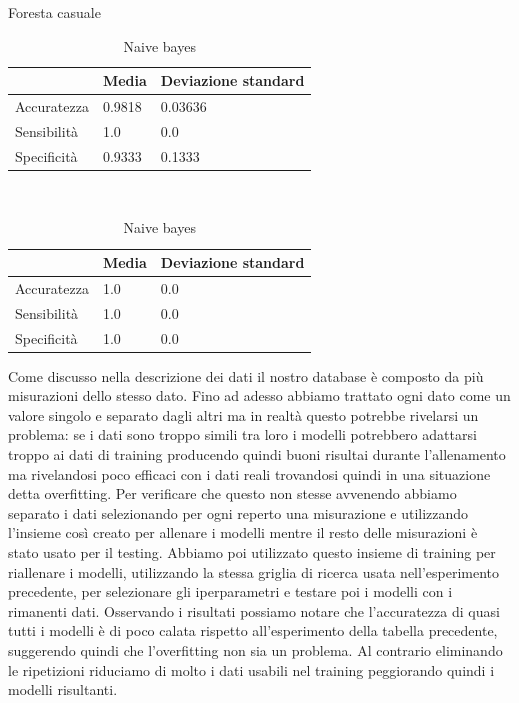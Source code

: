 \documentclass[a4paper,12pt]{report}
\begin{document}
\begin{table}
	\caption{Foresta casuale}
	\begin{tabular}{|l|l|l|}
	\hline
                & Media     & Deviazione standard	\\ \hline
	Accuratezza & 0.9818	& 0.03636				\\ \hline
    Sensibilità & 1.0		& 0.0					\\ \hline
    Specificità & 0.9333	& 0.1333				\\ \hline
	\end{tabular}
	\\


	\caption{Naive bayes}
	\begin{tabular}{|l|l|l|}
	\hline
                & Media     & Deviazione standard	\\ \hline
	Accuratezza & 1.0		& 0.0					\\ \hline
    Sensibilità & 1.0		& 0.0					\\ \hline
    Specificità & 1.0		& 0.0					\\ \hline
\end{tabular}
\end{table}


Come discusso nella descrizione dei dati il nostro database è composto da più
misurazioni dello stesso dato. Fino ad adesso abbiamo trattato ogni dato come un
valore singolo e separato dagli altri ma in realtà questo potrebbe rivelarsi un
problema: se i dati sono troppo simili tra loro i modelli potrebbero adattarsi
troppo ai dati di training producendo quindi buoni risultai durante
l'allenamento ma rivelandosi poco efficaci con i dati reali trovandosi quindi in
una situazione detta overfitting. Per verificare che questo non stesse avvenendo
abbiamo separato i dati selezionando per ogni reperto una misurazione e
utilizzando l'insieme così creato per allenare i modelli mentre il resto delle
misurazioni è stato usato per il testing. Abbiamo poi utilizzato questo insieme
di training per riallenare i modelli, utilizzando la stessa griglia di ricerca
usata nell'esperimento precedente, per selezionare gli iperparametri e testare
poi i modelli con i rimanenti dati. Osservando i risultati possiamo notare che
l'accuratezza di quasi tutti i modelli è di poco calata rispetto all'esperimento
della tabella precedente, suggerendo quindi che l'overfitting non sia un
problema. Al contrario eliminando le ripetizioni riduciamo di molto i dati
usabili nel training peggiorando quindi i modelli risultanti.
\end{document}
